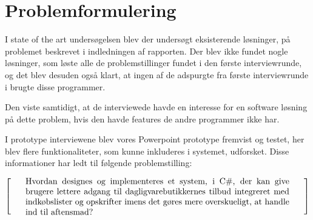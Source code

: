 \section{Problemformulering}\label{section:problemformulering}

I state of the art undersøgelsen  blev der undersøgt eksisterende løsninger, på problemet beskrevet i indledningen af rapporten. 
Der blev ikke fundet nogle løsninger, som løste alle de problemstillinger fundet i den første interviewrunde, og det blev desuden også klart, at ingen af de adspurgte fra første interviewrunde i  brugte disse programmer.

Den viste samtidigt, at de interviewede havde en interesse for en software løsning på dette problem, hvis den havde features de andre programmer ikke har. 

I prototype interviewene blev vores Powerpoint prototype fremvist og testet, her blev flere funktionaliteter, som kunne inkluderes i systemet, udforsket.
Disse informationer har ledt til følgende problemstilling:

\[
  \left[
  \begin{minipage}{\textwidth}
  \centering
  \begin{minipage}{0.9\textwidth}
  Hvordan designes og implementeres et system, i C\#, der kan give brugere lettere adgang til dagligvarebutikkernes tilbud integreret med indkøbslister og opskrifter imens det gøres mere overskueligt, at handle ind til aftensmad?
  \end{minipage} 
  \end{minipage}                           
    \right]
\]